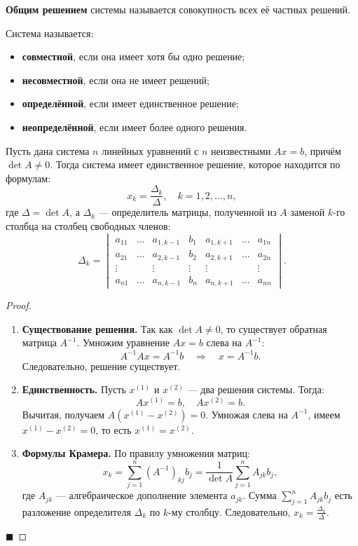 \begin{definition}
\textbf{Общим решением} системы называется совокупность всех её частных решений.
\end{definition}

\begin{definition}
Система называется:
\begin{itemize}
    \item \textbf{совместной}, если она имеет хотя бы одно решение;
    \item \textbf{несовместной}, если она не имеет решений;
    \item \textbf{определённой}, если имеет единственное решение;
    \item \textbf{неопределённой}, если имеет более одного решения.
\end{itemize}
\end{definition}

\begin{theorem}[Крамера]
Пусть дана система $n$ линейных уравнений с $n$ неизвестными $Ax = b$, причём $\det A \neq 0$. Тогда система имеет единственное решение, которое находится по формулам:
\[
x_k = \frac{\Delta_k}{\Delta}, \quad k = 1, 2, \ldots, n,
\]
где $\Delta = \det A$, а $\Delta_k$ --- определитель матрицы, полученной из $A$ заменой $k$-го столбца на столбец свободных членов:
\[
\Delta_k = \begin{vmatrix}
a_{11} & \ldots & a_{1,k-1} & b_1 & a_{1,k+1} & \ldots & a_{1n} \\
a_{21} & \ldots & a_{2,k-1} & b_2 & a_{2,k+1} & \ldots & a_{2n} \\
\vdots & & \vdots & \vdots & \vdots & & \vdots \\
a_{n1} & \ldots & a_{n,k-1} & b_n & a_{n,k+1} & \ldots & a_{nn}
\end{vmatrix}.
\]
\end{theorem}

\begin{proof}
\begin{enumerate}
    \item \textbf{Существование решения.} Так как $\det A \neq 0$, то существует обратная матрица $A^{-1}$. Умножим уравнение $Ax = b$ слева на $A^{-1}$:
    \[
    A^{-1}Ax = A^{-1}b \quad \Rightarrow \quad x = A^{-1}b.
    \]
    Следовательно, решение существует.
    
    \item \textbf{Единственность.} Пусть $x^{(1)}$ и $x^{(2)}$ --- два решения системы. Тогда:
    \[
    Ax^{(1)} = b, \quad Ax^{(2)} = b.
    \]
    Вычитая, получаем $A(x^{(1)} - x^{(2)}) = 0$. Умножая слева на $A^{-1}$, имеем $x^{(1)} - x^{(2)} = 0$, то есть $x^{(1)} = x^{(2)}$.
    
    \item \textbf{Формулы Крамера.} По правилу умножения матриц:
    \[
    x_k = \sum_{j=1}^n (A^{-1})_{kj} b_j = \frac{1}{\det A} \sum_{j=1}^n A_{jk} b_j,
    \]
    где $A_{jk}$ --- алгебраическое дополнение элемента $a_{jk}$. Сумма $\sum_{j=1}^n A_{jk} b_j$ есть разложение определителя $\Delta_k$ по $k$-му столбцу. Следовательно, $x_k = \frac{\Delta_k}{\Delta}$.
\end{enumerate}
\hfill$\blacksquare$
\end{proof}
